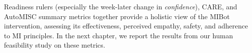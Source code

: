 Readiness rulers (especially the week-later change in \emph{confidence}), CARE, and AutoMISC summary metrics together provide a holistic view of the MIBot intervention, assessing its effectiveness, perceived empathy, safety, and adherence to MI principles. In the next chapter, we report the results from our human feasibility study on these metrics.
